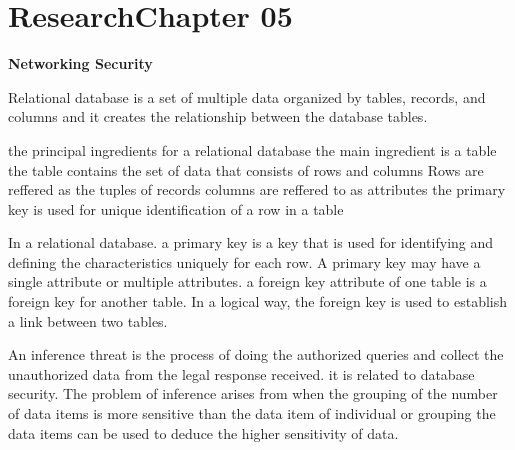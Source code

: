 \documentclass[]{subfiles}
\begin{document}

\chapter[Research Ch. 05]{Research\linebreak[1] Chapter 05 \hspace*{\fill}{\date}}
\noindent\textbf{{Networking Security} }                             


Relational database is a set of multiple data organized by tables, records, and columns
and it creates the relationship between the database tables. 
\begin{outline}
	\centering
	\1 the principal ingredients for a relational database
		\2 the main ingredient is a table
		\2 the table contains the set of data that consists of rows and columns
		\2 Rows are reffered as the tuples of records
		\2 columns are reffered to as attributes
		\2 the primary key is used for unique identification of a row in a table
\end{outline}


In a relational database. a primary key is a key that is used for identifying and
defining the characteristics uniquely for each row. A primary key may have a single
attribute or multiple attributes. 
a foreign key attribute of one table is a foreign key for another table. In a logical
way, the foreign key is used to establish a link between two tables.



An inference threat is the process of doing the authorized queries and collect the
unauthorized data from the legal response received. it is related to database security.
The problem of inference arises from when the grouping of the number of data items is
more sensitive than the data item of individual or grouping the data items can be used
to deduce the higher sensitivity of data.
\end{document}
